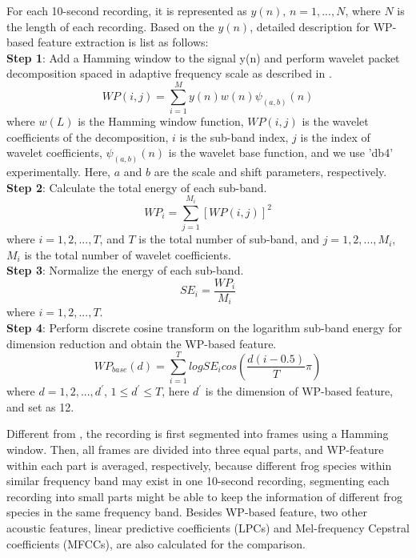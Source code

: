For each 10-second recording, it is represented as 
$y(n),\,n = 1,...,N$, where $N$ is the length of each recording. Based on the $y(n)$, detailed description for WP-based feature extraction is list as follows:\\
\textbf{Step 1}: Add a Hamming window to the signal y(n) and perform wavelet packet decomposition spaced in adaptive frequency scale as described in \citep{Xie2016}.
\begin{equation}
WP(i,j)=\sum_{i=1}^{M}y(n)w(n)\psi_{(a,b)}(n) 
\end{equation}
\noindent where $w(L)$ is the Hamming window function, $WP(i,j)$ is the wavelet coefficients of the decomposition, $i$ is the sub-band index, $j$ is the index of wavelet coefficients, $\psi_{(a,b)}(n)$ is the wavelet base function, and we use 'db4' experimentally. Here, $a$ and $b$ are the scale and shift parameters, respectively.
\\
\textbf{Step 2}: Calculate the total energy of each sub-band.
\begin{equation}
WP_{i}=\sum_{j=1}^{M_{i}}[WP(i,j)]^2
\end{equation}
\noindent where $i=1,2,...,T$, and $T$ is the total number of sub-band, and $j=1,2,...,M_{i}$, $M_{i}$ is the total number of wavelet coefficients.
\\
\textbf{Step 3}: Normalize the energy of each sub-band.
\begin{equation}
SE_{i}=\frac{WP_{i}}{M_{i}}
\end{equation}
\noindent where $i=1,2,...,T$.
\\
\textbf{Step 4}: Perform discrete cosine transform on the logarithm sub-band energy for dimension reduction and obtain the WP-based feature.
\begin{equation}
WP_{base}(d)=\sum_{i=1}^{T}logSE_{i}cos(\frac{d(i-0.5)}{T}\pi)
\end{equation}
\noindent where $d=1,2,...,d^{'}$, $1 \leq d^{'} \leq T$, here $d^{'}$ is the dimension of  WP-based feature, and set as 12. 

Different from \cite{Xie2016}, the recording is first segmented into frames using a Hamming window. Then, all frames are divided into three equal parts, and WP-feature within each part is averaged, respectively, because different frog species within similar frequency band may exist in one 10-second recording, segmenting each recording into small parts might be able to keep the information of different frog species in the same frequency band. Besides WP-based feature, two other acoustic features, linear predictive coefficients (LPCs) and Mel-frequency Cepstral coefficients (MFCCs), are also calculated for the comparison.




